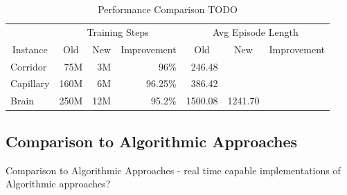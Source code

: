 \begin{table}[htp]
    \begin{center}
        \begin{tabular}{lrrrrrr}
            \toprule
            & \multicolumn{3}{c}{Training Steps} & \multicolumn{3}{c}{Avg Episode Length} \\
            \cmidrule(lr){2-4} \cmidrule(lr){5-7}
            \multicolumn{1}{c}{Instance} & \multicolumn{1}{c}{Old} & \multicolumn{1}{c}{New} & \multicolumn{1}{c}{Improvement} & \multicolumn{1}{c}{Old} & \multicolumn{1}{c}{New} & \multicolumn{1}{c}{Improvement} \\
            \midrule
            Corridor & 75M & 3M & 96\% & 246.48 & & \\
            Capillary & 160M & 6M & 96.25\% & 386.42 & & \\
            Brain & 250M & 12M & 95.2\% & 1500.08 & 1241.70 & \\
            \bottomrule
        \end{tabular}

    \end{center}
    \caption{Performance Comparison TODO} \label{tab:Eval/PreviousRLApproach}
\end{table}

\subsection{Comparison to Algorithmic Approaches} \label{sec:EvalAlgorithms}
Comparison to Algorithmic Approaches - real time capable implementations of Algorithmic approaches?


